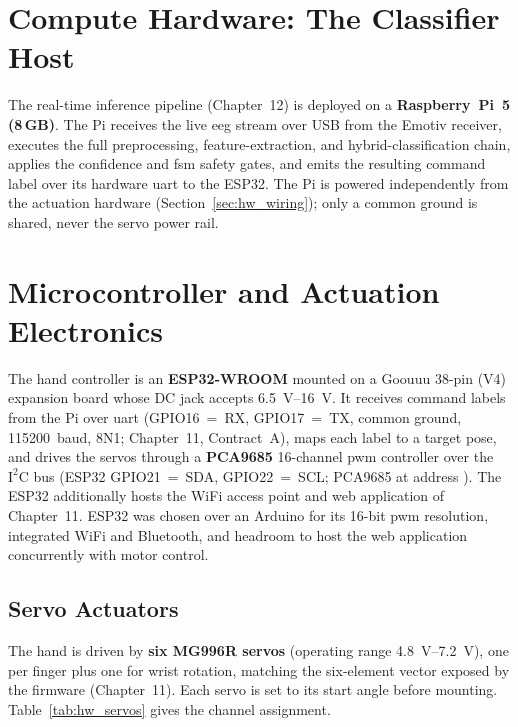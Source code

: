\section{Compute Hardware: The Classifier Host}
\label{sec:hw_compute}

The real-time inference pipeline (Chapter~12) is deployed on a
\textbf{Raspberry~Pi~5 (8\,GB)}. The Pi receives the live
\acrshort{eeg} stream over USB from the Emotiv receiver, executes the
full preprocessing, feature-extraction, and hybrid-classification
chain, applies the confidence and \acrshort{fsm} safety gates, and
emits the resulting command label over its hardware \acrshort{uart}
to the ESP32. The Pi is powered independently from the actuation
hardware (Section~\ref{sec:hw_wiring}); only a common ground is shared,
never the servo power rail.

\section{Microcontroller and Actuation Electronics}
\label{sec:hw_mcu}

The hand controller is an \textbf{ESP32-WROOM} mounted on a
Goouuu 38-pin (V4) expansion board whose DC jack accepts
\SIrange{6.5}{16}{\volt}. It receives command labels from the Pi over
\acrshort{uart} (GPIO16~=~RX, GPIO17~=~TX, common ground,
\SI{115200}{}~baud, 8N1; Chapter~11, Contract~A), maps each label to
a target pose, and drives the servos through a \textbf{PCA9685}
16-channel \acrshort{pwm} controller over the
\(\text{I}^2\text{C}\) bus (ESP32 GPIO21~=~SDA, GPIO22~=~SCL; PCA9685
at address ). The ESP32 additionally hosts the WiFi access
point and web application of Chapter~11. ESP32 was chosen over an
Arduino for its 16-bit \acrshort{pwm} resolution, integrated WiFi and
Bluetooth, and headroom to host the web application concurrently with
motor control.

\subsection{Servo Actuators}
\label{sec:hw_servos}

The hand is driven by \textbf{six MG996R servos} (operating range
\SIrange{4.8}{7.2}{\volt}), one per finger plus one for wrist
rotation, matching the six-element  vector exposed
by the firmware (Chapter~11). Each servo is set to its start angle
before mounting. Table~\ref{tab:hw_servos} gives the channel
assignment.

